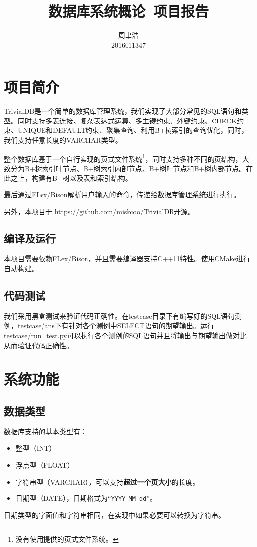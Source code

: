 \documentclass[10pt]{article}
\title{数据库系统概论\ 项目报告}
\author{周聿浩\\ \small{2016011347}}
\begin{document}
\maketitle
\tableofcontents
\clearpage
\section{项目简介}
TrivialDB是一个简单的数据库管理系统，我们实现了大部分常见的SQL语句和类型。同时支持多表连接、复杂表达式运算、多主键约束、外键约束、CHECK约束、UNIQUE和DEFAULT约束、聚集查询、利用B+树索引的查询优化，同时，我们支持任意长度的VARCHAR类型。

整个数据库基于一个自行实现的页式文件系统\footnote{没有使用提供的页式文件系统。}，同时支持多种不同的页结构，大致分为B+树索引叶节点、B+树索引内部节点、B+树叶节点和B+树内部节点。在此之上，构建有B+树以及表和索引结构。

最后通过FLex/Bison解析用户输入的命令，传递给数据库管理系统进行执行。

另外，本项目于 \url{https://github.com/miskcoo/TrivialDB}开源。

\subsection{编译及运行}
本项目需要依赖FLex/Bison，并且需要编译器支持C++11特性。使用CMake进行自动构建。

\subsection{代码测试}
我们采用黑盒测试来验证代码正确性。在testcase目录下有编写好的SQL语句测例，testcase/ans下有针对各个测例中SELECT语句的期望输出。运行testcase/run\_test.py可以执行各个测例的SQL语句并且将输出与期望输出做对比从而验证代码正确性。
\section{系统功能}
\subsection{数据类型}
数据库支持的基本类型有：
\begin{itemize}
	\item 整型（INT）
	\item 浮点型（FLOAT）
	\item 字符串型（VARCHAR），可以支持\textbf{超过一个页大小}的长度。
	\item 日期型（DATE），日期格式为``\texttt{YYYY-MM-dd}''。
\end{itemize}
日期类型的字面值和字符串相同，在实现中如果必要可以转换为字符串。
\end{document}
